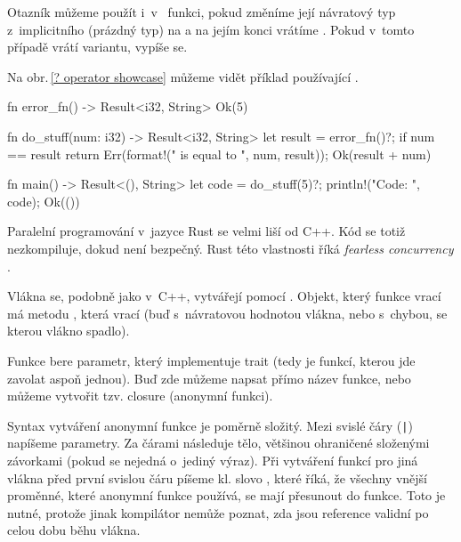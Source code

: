 \documentclass[main.tex]{subfiles}
\begin{document}
Otazník můžeme použít i~v~ funkci, pokud změníme její návratový typ
z~implicitního \irust{()} (prázdný typ) na  a na jejím konci vrátíme
. Pokud v~tomto případě  vrátí  variantu, vypíše se.

Na obr.\,\ref{? operator showcase} můžeme vidět příklad používající .

\obrazek
\begin{rustcode}
fn error_fn() -> Result<i32, String> {
    Ok(5)
}

fn do_stuff(num: i32) -> Result<i32, String> {
    let result = error_fn()?;
    if num == result {
        return Err(format!("{} is equal to {}", num, result));
    }
    Ok(result + num)
}

fn main() -> Result<(), String> {
    let code = do_stuff(5)?;
    println!("Code: {}", code);
    Ok(())
}
\end{rustcode}
\newline
{}


Paralelní programování v~jazyce Rust se velmi liší od C++. Kód se totiž nezkompiluje,
dokud není bezpečný. Rust této vlastnosti říká \emph{fearless concurrency}
\cite[kapitola\,16]{thebook}.


Vlákna se, podobně jako v~C++, vytvářejí pomocí . Objekt, který
funkce vrací má metodu , která vrací  (buď s~návratovou
hodnotou vlákna, nebo s~chybou, se kterou vlákno spadlo).

Funkce  bere  parametr, který implementuje trait 
(tedy je funkcí, kterou jde zavolat aspoň jednou). Buď zde můžeme napsat přímo název
funkce, nebo můžeme vytvořit tzv. closure (anonymní funkci).

Syntax vytváření anonymní funkce je poměrně složitý. Mezi svislé čáry (\texttt{|})
napíšeme parametry. Za čárami následuje tělo, většinou ohraničené složenými závorkami
(pokud se nejedná o~jediný výraz). Při vytváření funkcí pro jiná vlákna před první
svislou čáru píšeme kl. slovo , které říká, že všechny vnější proměnné, které
anonymní funkce používá, se mají přesunout do funkce. Toto je nutné, protože jinak
kompilátor nemůže poznat, zda jsou reference validní po celou dobu běhu vlákna.
\cite[sekce\,13.1]{thebook}
\end{document}
